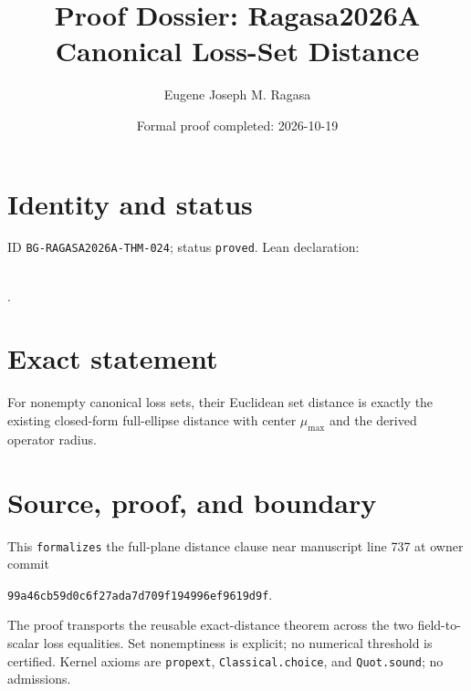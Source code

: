 \documentclass[11pt]{article}
\title{Proof Dossier: Ragasa2026A Canonical Loss-Set Distance}\author{Eugene Joseph M. Ragasa}\date{Formal proof completed: 2026-10-19}
\begin{document}
\maketitle
\section{Identity and status}
ID \texttt{BG-RAGASA2026A-THM-024}; status \texttt{proved}. Lean declaration:
\par{}\\
{\tiny{}}.
\section{Exact statement}
For nonempty canonical loss sets, their Euclidean set distance is exactly the existing
closed-form full-ellipse distance with center $\mu_{\max}$ and the derived operator
radius.
\section{Source, proof, and boundary}
This \texttt{formalizes} the full-plane distance clause near manuscript line 737 at owner
commit
\begin{center}\small\texttt{99a46cb59d0c6f27ada7d709f194996ef9619d9f}.\end{center}
The proof transports the reusable exact-distance theorem across the two field-to-scalar
loss equalities. Set nonemptiness is explicit; no numerical threshold is certified.
Kernel axioms are \texttt{propext}, \texttt{Classical.choice}, and
\texttt{Quot.sound}; no admissions.
\end{document}
